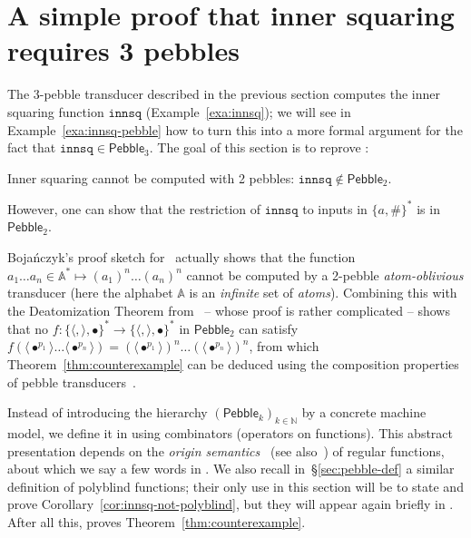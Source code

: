 \documentclass{fundam}
\newcommand{\bbN}{\mathbb{N}}
\newcommand{\atoms}{\mathbb{A}}
\newcommand{\Pebble}{\mathsf{Pebble}}
\theoremstyle{claimstyle}
\newcommand\innsq{\mathtt{innsq}}
\begin{document}
\section{A simple proof that inner squaring requires 3 pebbles}
\label{sec:innsq-non-min}

The 3-pebble transducer described in the previous section computes the inner
squaring function $\innsq$ (Example~\ref{exa:innsq}); we will see in
Example~\ref{exa:innsq-pebble} how to turn this into a more formal argument for
the fact that $\innsq \in \Pebble_3$. The goal of this section is to reprove
{\cite[Theorem~6.3]{PolyregSurvey}}:
\begin{theorem}
  \label{thm:counterexample}
  Inner squaring cannot be computed with 2 pebbles: $\innsq \notin \Pebble_2$.
\end{theorem}
\begin{remark}
  However, one can show that the restriction of $\innsq$ to inputs in $\{a,\#\}^*$ is in $\Pebble_2$.  
\end{remark}
\begin{remark}\label{rem:deatomization}
  Bojańczyk's proof sketch for~\cite[Theorem~6.3]{PolyregSurvey} actually shows that the function
  $a_1 \dots a_n \in \atoms^* \mapsto (a_1)^n \dots (a_n)^n$
  cannot be computed by a 2-pebble \emph{atom-oblivious} transducer (here the alphabet $\atoms$ is an \emph{infinite} set of \emph{atoms}). Combining this with the Deatomization Theorem from~\cite{PolyregGrowth} -- whose proof is rather complicated -- shows that no $f \colon \{\langle,\rangle,\bullet\}^* \to \{\langle,\rangle,\bullet\}^*$ in $\Pebble_2$ can satisfy
  $f(\langle \bullet^{p_1} \rangle \dots \langle \bullet^{p_n} \rangle) = (\langle \bullet^{p_1} \rangle)^n \dots (\langle \bullet^{p_n} \rangle)^n$,
  from which Theorem~\ref{thm:counterexample} can be deduced using the composition properties of pebble transducers~\cite{PebbleComposition}.
\end{remark}

Instead of introducing the hierarchy $(\Pebble_k)_{k\in\bbN}$ by a concrete
machine model, we define it in  using
combinators (operators on functions). This abstract presentation depends on the
\emph{origin semantics}~\cite{origin} (see also~\cite[\S5]{MuschollPuppis}) of
regular functions, about which we say a few words in . We
also recall in~\S\ref{sec:pebble-def} a similar definition of polyblind
functions; their only use in this section will be to state and prove
Corollary~\ref{cor:innsq-not-polyblind}, but they will appear again briefly in
. After all this,  proves
Theorem~\ref{thm:counterexample}.
\end{document}
